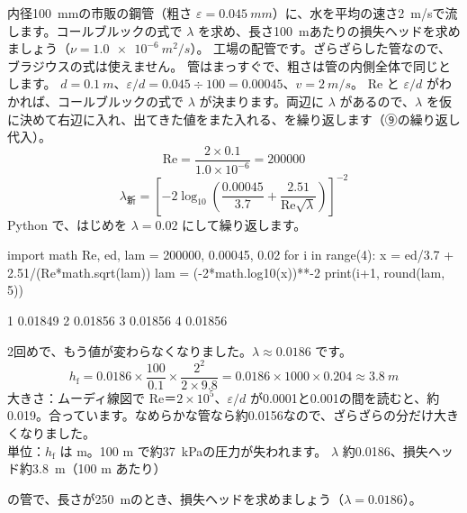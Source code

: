 \begin{phreidai}\label{ph:力-14:ex5}
内径\qty{100}{mm}の市販の鋼管（粗さ $\varepsilon=\qty{0.045}{mm}$）に、水を平均の速さ\qty{2}{m/s}で流します。コールブルックの式で $\lambda$ を求め、長さ\qty{100}{m}あたりの損失ヘッドを求めましょう（$\nu=\qty{1.0e-6}{m^2/s}$）。
\phbamen
工場の配管です。ざらざらした管なので、ブラジウスの式は使えません。
\phmushi
管はまっすぐで、粗さは管の内側全体で同じとします。
\phzu
$d=\qty{0.1}{m}$、$\varepsilon/d=0.045\div 100=0.00045$、$v=\qty{2}{m/s}$。
\phriyu
Re と $\varepsilon/d$ がわかれば、コールブルックの式で $\lambda$ が決まります。両辺に $\lambda$ があるので、$\lambda$ を仮に決めて右辺に入れ、出てきた値をまた入れる、を繰り返します（⑨の繰り返し代入）。
\phtateru
\[\mathrm{Re}=\frac{2\times0.1}{1.0\times10^{-6}}=\num{200000}\]
\[\lambda_{\text{新}}=\left[-2\log_{10}\left(\frac{0.00045}{3.7}+\frac{2.51}{\mathrm{Re}\sqrt{\lambda}}\right)\right]^{-2}\]
\phtoku
Python で、はじめを $\lambda=0.02$ にして繰り返します。
\begin{phcode}
import math
Re, ed, lam = 200000, 0.00045, 0.02
for i in range(4):
    x = ed/3.7 + 2.51/(Re*math.sqrt(lam))
    lam = (-2*math.log10(x))**-2
    print(i+1, round(lam, 5))
\end{phcode}
\begin{phcodeout}
1 0.01849
2 0.01856
3 0.01856
4 0.01856
\end{phcodeout}
2回めで、もう値が変わらなくなりました。$\lambda\approx0.0186$ です。
\[h_{\mathrm f}=0.0186\times\frac{100}{0.1}\times\frac{2^2}{2\times9.8}=0.0186\times1000\times0.204\approx\qty{3.8}{m}\]
\phtashikame
大きさ：ムーディ線図で Re＝$2\times10^5$、$\varepsilon/d$ が0.0001と0.001の間を読むと、約0.019。合っています。なめらかな管なら約0.0156なので、ざらざらの分だけ大きくなりました。\\
単位：$h_{\mathrm f}$ は m。100 m で約\qty{37}{kPa}の圧力が失われます。
\kotae $\lambda$ 約0.0186、損失ヘッド約\qty{3.8}{m}（100 m あたり）
\end{phreidai}
\begin{jibun}
の管で、長さが\qty{250}{m}のとき、損失ヘッドを求めましょう（$\lambda=0.0186$）。
\end{jibun}

